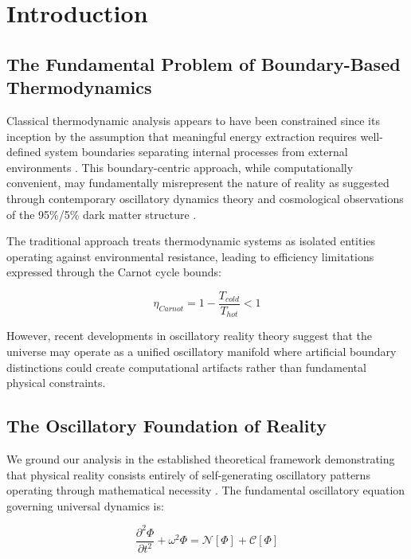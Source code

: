 \documentclass[11pt,a4paper]{article}
\theoremstyle{remark}
\begin{document}
\section{Introduction}

\subsection{The Fundamental Problem of Boundary-Based Thermodynamics}

Classical thermodynamic analysis appears to have been constrained since its inception by the assumption that meaningful energy extraction requires well-defined system boundaries separating internal processes from external environments \cite{carnot1824reflections,clausius1867mechanical}. This boundary-centric approach, while computationally convenient, may fundamentally misrepresent the nature of reality as suggested through contemporary oscillatory dynamics theory and cosmological observations of the 95\%/5\% dark matter structure \cite{weinberg2008cosmology,tegmark2014our}.

The traditional approach treats thermodynamic systems as isolated entities operating against environmental resistance, leading to efficiency limitations expressed through the Carnot cycle bounds:

\begin{equation}
\eta_{Carnot} = 1 - \frac{T_{cold}}{T_{hot}} < 1
\label{eq:carnot_limit}
\end{equation}

However, recent developments in oscillatory reality theory \cite{sachikonye2024mathematical} suggest that the universe may operate as a unified oscillatory manifold where artificial boundary distinctions could create computational artifacts rather than fundamental physical constraints.

\subsection{The Oscillatory Foundation of Reality}

We ground our analysis in the established theoretical framework demonstrating that physical reality consists entirely of self-generating oscillatory patterns operating through mathematical necessity \cite{sachikonye2024cosmological}. The fundamental oscillatory equation governing universal dynamics is:

\begin{equation}
\frac{\partial^2 \Phi}{\partial t^2} + \omega^2 \Phi = \mathcal{N}[\Phi] + \mathcal{C}[\Phi]
\label{eq:universal_oscillation}
\end{equation}
\end{document}
